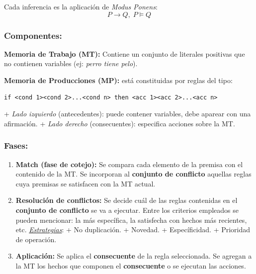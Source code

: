 \documentclass[10pt,a4paper]{article}
\begin{document}
Cada inferencia es la aplicación de \textit{Modus Ponens}:
\[P \rightarrow Q, \; P \models Q\]

\subsubsection{Componentes:}
\begin{description}
\item \textbf{Memoria de Trabajo (MT):} Contiene un conjunto de literales positivas que no contienen variables (ej: \textit{perro tiene pelo}).
\item \textbf{Memoria de Producciones (MP):} está constituidas por reglas del tipo:
\begin{verbatim}
if <cond 1><cond 2>...<cond n> then <acc 1><acc 2>...<acc n>
\end{verbatim}
\subitem + \textit{Lado izquierdo} (antecedentes): puede contener variables, debe aparear con una afirmación.
\subitem + \textit{Lado derecho} (consecuentes): especifica acciones sobre la MT.
\end{description}

\subsubsection{Fases:}
\begin{enumerate}
\item \textbf{Match (fase de cotejo):} Se compara cada elemento de la premisa con el contenido de la MT. Se incorporan al \textbf{conjunto de conflicto} aquellas reglas cuya premisas se satisfacen con la MT actual.
\item \textbf{Resolución de conflictos:} Se decide cuál de las reglas contenidas en el \textbf{conjunto de conflicto} se va a ejecutar. Entre los criterios empleados se pueden mencionar: la más específica, la satisfecha con hechos más recientes, etc. 
\subitem \underline{\textit{Estrategias}}:
\subitem + No duplicación.
\subitem + Novedad.
\subitem + Específicidad.
\subitem + Prioridad de operación.
\item \textbf{Aplicación:} Se aplica el \textbf{consecuente} de la regla seleccionada. Se agregan a la MT los hechos que componen el \textbf{consecuente} o se ejecutan las acciones.
\end{enumerate}
\end{document}
